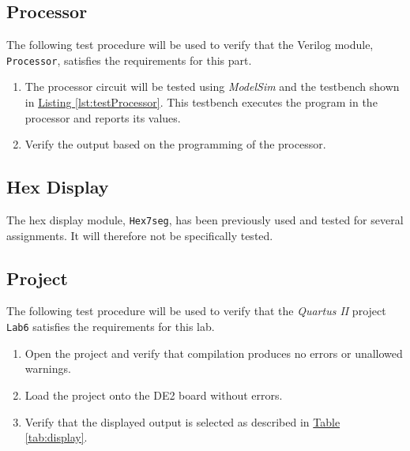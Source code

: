 
\subsection{Processor} %
\label{sub:processor_pro}

The following test procedure will be used to verify that the Verilog module, \verb|Processor|, satisfies the requirements for this part.

\begin{enumerate}
    \item The processor circuit will be tested using \emph{ModelSim} and the testbench shown in \hyperref[lst:testProcessor]{Listing \ref*{lst:testProcessor}}.
    This testbench executes the program in the processor and reports its values.
    \item Verify the output based on the programming of the processor.
\end{enumerate}


\subsection{Hex Display} %
\label{sub:hex_display}

The hex display module, \verb|Hex7seg|, has been previously used and tested for several assignments.
It will therefore not be specifically tested.

\subsection{Project} %
\label{sub:project_pro}

The following test procedure will be used to verify that the \emph{Quartus II} project \verb|Lab6| satisfies the requirements for this lab.

\begin{enumerate}
    \item Open the project and verify that compilation produces no errors or unallowed warnings.
    \item Load the project onto the DE2 board without errors.
    \item Verify that the displayed output is selected as described in \hyperref[tab:display]{Table \ref*{tab:display}}.
\end{enumerate}


